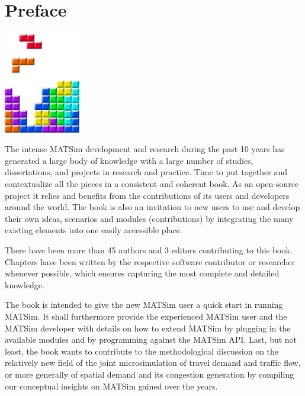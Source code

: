 \chapter*{Preface}

\begin{center} \includegraphics[width=0.25\textwidth, angle=0]{figures/MATSimBook.png} \end{center}


The intense MATSim development and research during the past 10 years has generated a large body of knowledge with a large number of studies, dissertations, and projects in research and practice. Time to put together and contextualize all the pieces in a consistent and coherent book. As an open-source project it relies and benefits from the contributions of its users and developers around the world. The book is also an invitation to new users to use and develop their own ideas, scenarios and modules (contributions) by integrating the many existing elements into one easily accessible place.

There have been more than 45 authors and 3 editors contributing to this book. Chapters have been written by the respective software contributor or researcher whenever possible, which ensures capturing the most complete and detailed knowledge. 

The book is intended to give the new MATSim user a quick start in running MATSim. It shall furthermore provide the experienced MATSim user and the MATSim developer with details on how to extend MATSim by plugging in the available modules and by programming against the MATSim API. Last, but not least, the book wants to contribute to the methodological discussion on the relatively new field of the joint microsimulation of travel demand and traffic flow, or more generally of spatial demand and its congestion generation by compiling our conceptual insights on MATSim gained over the years.

